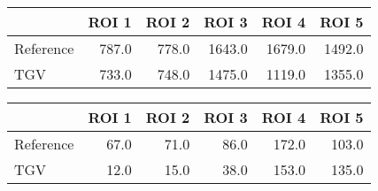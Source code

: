 \begin{tabular}{lrrrrr}
\toprule
{} &  ROI 1 &  ROI 2 &   ROI 3 &   ROI 4 &   ROI 5 \\
\midrule
Reference &  787.0 &  778.0 &  1643.0 &  1679.0 &  1492.0 \\
TGV       &  733.0 &  748.0 &  1475.0 &  1119.0 &  1355.0 \\
\bottomrule
\end{tabular}
\begin{tabular}{lrrrrr}
\toprule
{} &  ROI 1 &  ROI 2 &  ROI 3 &  ROI 4 &  ROI 5 \\
\midrule
Reference &   67.0 &   71.0 &   86.0 &  172.0 &  103.0 \\
TGV       &   12.0 &   15.0 &   38.0 &  153.0 &  135.0 \\
\bottomrule
\end{tabular}
